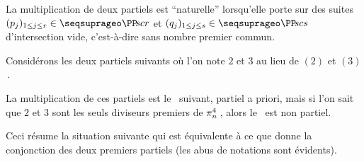\begin{example}
	La multiplication de deux \sftab[x] partiels est \enquote{naturelle} lorsqu'elle porte sur des suites
	$( p_j )_{1 \leq j \leq r} \in \PPseq[r]$
	et
	$( q_j )_{1 \leq j \leq s} \in \PPseq[s]$
	d'intersection vide, c'est-à-dire sans nombre premier commun.
	
	\smallskip	
	Considérons les deux \sftab[x] partiels suivants où l'on note $2$ et $3$ au lieu de $(2)$ et $(3)$\,.

	\vspace{-1.5ex}
	\begin{multicols}{2}
	\begin{center}
	\end{center}

	\begin{center}
	\end{center}
	\end{multicols}


	\vspace{-1ex}
	La multiplication de ces \sftab[x] partiels est le \sftab\  suivant, partiel a priori, mais si l'on sait que $2$ et $3$ sont les seuls diviseurs premiers de $\consprod<4>$\,, alors le \sftab\ est non partiel.

	\begin{center}
	\end{center}

	Ceci résume la situation suivante qui est équivalente à ce que donne la conjonction des deux premiers \sftab[x] partiels (les abus de notations sont évidents).



\end{example}
